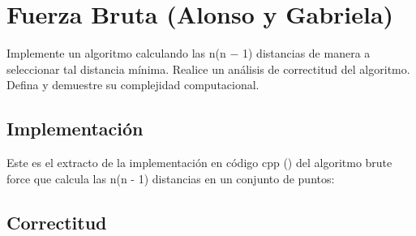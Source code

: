 \documentclass[informe.tex]{subfiles}
\begin{document}
\section{Fuerza Bruta (Alonso y Gabriela)}

Implemente un algoritmo  calculando las n(n − 1) distancias de manera a
seleccionar tal distancia mínima. Realice un análisis de correctitud del algoritmo. Defina y
demuestre su complejidad computacional.


\subsection{Implementación}

Este es el extracto de la implementación en código cpp () del algoritmo brute
force que calcula las n(n - 1) distancias en un conjunto de puntos:
\vspace{1em}

\vspace{1em}

\subsection{Correctitud}
\end{document}
